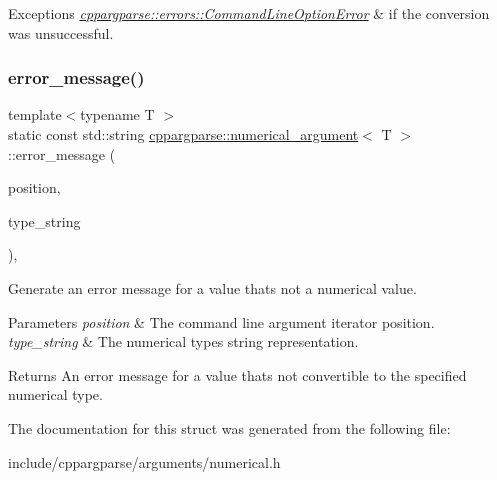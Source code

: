 \begin{DoxyExceptions}{Exceptions}
{\em \hyperlink{classcppargparse_1_1errors_1_1CommandLineOptionError}{cppargparse\+::errors\+::\+Command\+Line\+Option\+Error}} & if the conversion was unsuccessful. \\
\hline
\end{DoxyExceptions}
\mbox{\label{structcppargparse_1_1numerical__argument_a05ead3c772c43a02b6608ef2b2382fb8}} 
\subsubsection{\texorpdfstring{error\+\_\+message()}{error\_message()}}
{\footnotesize\ttfamily template$<$typename T $>$ \\
static const std\+::string \hyperlink{structcppargparse_1_1numerical__argument}{cppargparse\+::numerical\+\_\+argument}$<$ T $>$\+::error\+\_\+message (\begin{DoxyParamCaption}\item[{const \hyperlink{types_8h_a43b4f43f8940de1bf09ced6f1b668053}{types\+::\+Command\+Line\+Position\+\_\+t} \&}]{position,  }\item[{const std\+::string \&}]{type\+\_\+string }\end{DoxyParamCaption})\hspace{0.3cm}{\ttfamily [inline]}, {\ttfamily [static]}}



Generate an error message for a value that\textquotesingle{}s not a numerical value. 


\begin{DoxyParams}{Parameters}
{\em position} & The command line argument iterator position. \\
\hline
{\em type\+\_\+string} & The numerical type\textquotesingle{}s string representation.\\
\hline
\end{DoxyParams}
\begin{DoxyReturn}{Returns}
An error message for a value that\textquotesingle{}s not convertible to the specified numerical type. 
\end{DoxyReturn}


The documentation for this struct was generated from the following file\+:\begin{DoxyCompactItemize}
\item 
include/cppargparse/arguments/numerical.\+h\end{DoxyCompactItemize}
